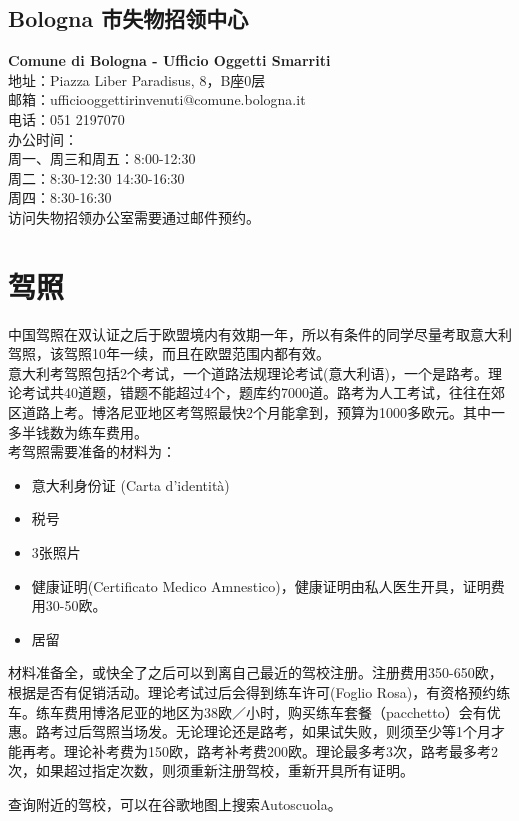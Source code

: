 \subsection{Bologna 市失物招领中心}
\textbf{Comune di Bologna - Ufficio Oggetti Smarriti}\\
地址：Piazza Liber Paradisus, 8，B座0层\\
邮箱：ufficiooggettirinvenuti@comune.bologna.it\\
电话：051 2197070 \\
办公时间：\\
周一、周三和周五：8:00-12:30\\
周二：8:30-12:30 14:30-16:30\\
周四：8:30-16:30\\
访问失物招领办公室需要通过邮件预约。\\



\section{驾照}

中国驾照在双认证之后于欧盟境内有效期一年，所以有条件的同学尽量考取意大利驾照，该驾照10年一续，而且在欧盟范围内都有效。\\
意大利考驾照包括2个考试，一个道路法规理论考试(意大利语)，一个是路考。理论考试共40道题，错题不能超过4个，题库约7000道。路考为人工考试，往往在郊区道路上考。博洛尼亚地区考驾照最快2个月能拿到，预算为1000多欧元。其中一多半钱数为练车费用。\\
考驾照需要准备的材料为：
\begin{itemize}
\item 意大利身份证 (Carta d'identità)
\item 税号
\item 3张照片
\item 健康证明(Certificato Medico Amnestico)，健康证明由私人医生开具，证明费用30-50欧。
\item 居留
\end{itemize}
材料准备全，或快全了之后可以到离自己最近的驾校注册。注册费用350-650欧，根据是否有促销活动。理论考试过后会得到练车许可(Foglio Rosa)，有资格预约练车。练车费用博洛尼亚的地区为38欧／小时，购买练车套餐（pacchetto）会有优惠。路考过后驾照当场发。无论理论还是路考，如果试失败，则须至少等1个月才能再考。理论补考费为150欧，路考补考费200欧。理论最多考3次，路考最多考2次，如果超过指定次数，则须重新注册驾校，重新开具所有证明。

查询附近的驾校，可以在谷歌地图上搜索Autoscuola。


